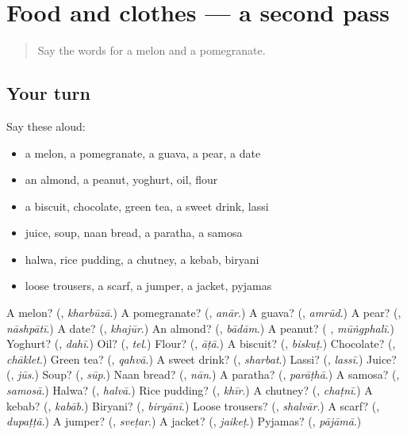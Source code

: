 \section[(dialogue)]{Food and clothes — a second pass}

\label{lesson:UR-R121-second-pass-food-and-clothes}



\begin{quote}
Say the words for a melon and a pomegranate.
\end{quote}

\subsection*{Your turn}
Say these aloud:

\begin{itemize}
\raggedright
  \item a melon, a pomegranate, a guava, a pear, a date
  \item an almond, a peanut, yoghurt, oil, flour
  \item a biscuit, chocolate, green tea, a sweet drink, lassi
  \item juice, soup, naan bread, a paratha, a samosa
  \item halwa, rice pudding, a chutney, a kebab, biryani
  \item loose trousers, a scarf, a jumper, a jacket, pyjamas
\end{itemize}

\begin{tcolorbox}[breakable,colback=teal!4,colframe=teal!35!black,title={Before you move on}]
A melon? (\textbf{}, \emph{kharbūzā}.) A pomegranate? (\textbf{}, \emph{anār}.) A guava? (\textbf{}, \emph{amrūd}.) A pear? (\textbf{}, \emph{nāshpātī}.) A date? (\textbf{}, \emph{khajūr}.) An almond? (\textbf{}, \emph{bādām}.) A peanut? (\textbf{ }, \emph{mūṅgphalī}.) Yoghurt? (\textbf{}, \emph{dahī}.) Oil? (\textbf{}, \emph{tel}.) Flour? (\textbf{}, \emph{āṭā}.) A biscuit? (\textbf{}, \emph{biskuṭ}.) Chocolate? (\textbf{}, \emph{chāklet}.) Green tea? (\textbf{}, \emph{qahvā}.) A sweet drink? (\textbf{}, \emph{sharbat}.) Lassi? (\textbf{}, \emph{lassī}.) Juice? (\textbf{}, \emph{jūs}.) Soup? (\textbf{}, \emph{sūp}.) Naan bread? (\textbf{}, \emph{nān}.) A paratha? (\textbf{}, \emph{parāṭhā}.) A samosa? (\textbf{}, \emph{samosā}.) Halwa? (\textbf{}, \emph{halvā}.) Rice pudding? (\textbf{}, \emph{khīr}.) A chutney? (\textbf{}, \emph{chaṭnī}.) A kebab? (\textbf{}, \emph{kabāb}.) Biryani? (\textbf{}, \emph{biryānī}.) Loose trousers? (\textbf{}, \emph{shalvār}.) A scarf? (\textbf{}, \emph{dupaṭṭā}.) A jumper? (\textbf{}, \emph{sveṭar}.) A jacket? (\textbf{}, \emph{jaikeṭ}.) Pyjamas? (\textbf{}, \emph{pājāmā}.)
\end{tcolorbox}
